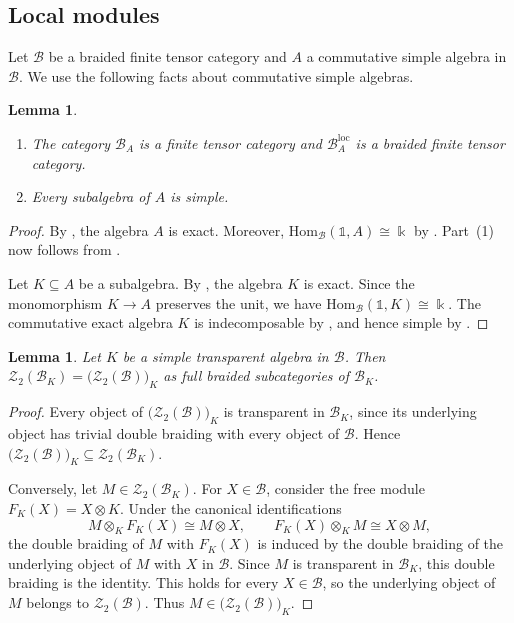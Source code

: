 \documentclass[10pt,a4paper]{amsart}
\numberwithin{equation}{section}
\newtheorem{lemma}[thmctr]{Lemma}
\newcommand{\kk}{\Bbbk}
\newcommand{\unit}{\mathds{1}}
\newcommand{\B}{\mathcal{B}}
\newcommand{\Z}{\mathcal{Z}}
\newcommand{\loc}{\mathrm{loc}}
\newcommand{\Hom}{\mathrm{Hom}}
\begin{document}
\subsection{Local modules}
Let $\B$ be a braided finite tensor category and $A$ a commutative simple algebra in $\B$. We use the following facts about commutative simple algebras.

\begin{lemma}\label{lem:simple-commutative-module-categories}
\begin{enumerate}
  \item The category $\B_A$ is a finite tensor category and
  $\B_A^{\loc}$ is a braided finite tensor category.
  \item Every subalgebra of $A$ is simple.
\end{enumerate}
\end{lemma}

\begin{proof}
By \cite[Theorem~7.1]{coulembier2025simple}, the algebra $A$ is exact.
Moreover, $\Hom_{\B}(\unit,A)\cong\kk$ by
\cite[Lemma~5.9]{shimizu2026commutative}. Part~(1) now follows from
\cite[Theorem~5.5]{shimizu2026commutative}.

Let $K\subseteq A$ be a subalgebra. By
\cite[Proposition~5.6]{ostrik2026non}, the algebra $K$ is exact. Since the
monomorphism $K\to A$ preserves the unit, we have
$\Hom_{\B}(\unit,K)\cong\kk$. The commutative exact algebra $K$ is
indecomposable by \cite[Lemma~5.8]{shimizu2026commutative}, and hence simple
by
\cite[Theorem~7.1]{coulembier2025simple}.
\end{proof}

\begin{lemma}\label{lem:transparent-muger-center}
Let $K$ be a simple transparent algebra in $\B$. Then
$\Z_2(\B_K)=\bigl(\Z_2(\B)\bigr)_K$ as full braided subcategories of
$\B_K$.
\end{lemma}

\begin{proof}
Every object of $\bigl(\Z_2(\B)\bigr)_K$ is transparent in $\B_K$, since
its underlying object has trivial double braiding with every object of
$\B$. Hence
$\bigl(\Z_2(\B)\bigr)_K\subseteq\Z_2(\B_K)$.

Conversely, let $M\in\Z_2(\B_K)$. For $X\in\B$, consider the free module
$F_K(X)=X\otimes K$. Under the canonical identifications
\[
  M\otimes_K F_K(X)\cong M\otimes X,
  \qquad
  F_K(X)\otimes_K M\cong X\otimes M,
\]
the double braiding of $M$ with $F_K(X)$ is induced by the double braiding
of the underlying object of $M$ with $X$ in $\B$. Since $M$ is transparent
in $\B_K$, this double braiding is the identity. This holds for every
$X\in\B$, so the underlying object of $M$ belongs to $\Z_2(\B)$. Thus
$M\in\bigl(\Z_2(\B)\bigr)_K$.
\end{proof}
\end{document}
